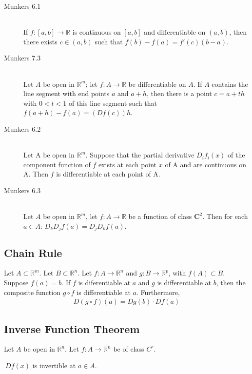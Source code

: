 \begin{description}
	\item[Munkers 6.1] \hfill \\
		If $f:[a,b] \to \mathbb{R}$ is continuous on $[a,b]$ and differentiable on $(a,b)$, then there exists $c \in (a,b)$ such that $f(b)-f(a) = f'(c)(b-a)$.

	\item[Munkers 7.3] \hfill \\
		Let $A$ be open in $\mathbb{R}^m$; let $f:A \to \mathbb{R}$ be differentiable on $A$. If $A$ contains the line segment with end points $a$ and $a+h$, then there is a point $c = a+th$ with $0 < t < 1$ of this line segment such that $f(a+h)-f(a) = (Df(c))h$.

	\item[Munkers 6.2] \hfill \\
		Let A be open in $\mathbb{R}^m$.
		Suppose that the partial derivative
		$D_if_i(x)$ of the component function
		of $f$ exists at each point $x$ of A and are continuous on A.
		Then $f$ is differentiable at each point of A.

	\item[Munkers 6.3] \hfill \\
		Let $A$ be open in $\mathbb{R}^m$, let $f: A \to \mathbb{R}$
		be a function of class $\mathbf{C}^2$. Then for each $a\in A$:
		$D_kD_jf(a)=D_jD_kf(a)$.
\end{description}

\subsection{Chain Rule}
Let $A \subset \mathbb{R}^m$. Let $B \subset \mathbb{R}^n$.
Let $f : A \to \mathbb{R}^n$ and $g : B\to \mathbb{R}^p$, with $f(A) \subset B$. Suppose $f(a) = b$. If $f$ is diferentiable at $a$ and $g$ is differentiable at $b$, then the composite function $g \circ f$ is differentiable at $a$. Furthermore,
\begin{align*}
D(g \circ f)(a) = Dg(b) \cdot Df(a)
\end{align*}

\subsection{Inverse Function Theorem}
\label{thm_ivft}
Let $A$ be open in $\mathbb{R}^n$.
Let $f:A\to\mathbb{R}^n$ be of class $C^r$.

\thmIF
	$\ Df(x)$ is invertible at $a\in A$.

